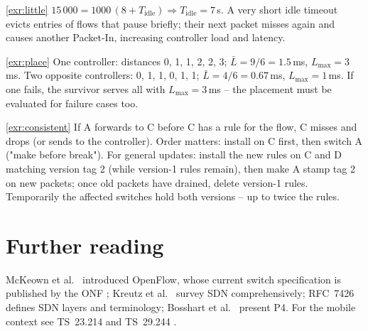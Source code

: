 \documentclass[11pt,a4paper]{article}
\begin{document}
\begin{solutionbox}{\ref{exr:little}}
$15\,000 = 1000\,(8 + T_{\mathrm{idle}}) \Rightarrow T_{\mathrm{idle}} = 7$\,s. A very short idle timeout evicts entries of
flows that pause briefly; their next packet misses again and causes another Packet-In, increasing controller load
and latency.
\end{solutionbox}

\begin{solutionbox}{\ref{exr:place}}
One controller: distances 0, 1, 1, 2, 2, 3; $\bar L = 9/6 = 1.5$\,ms, $L_{\max} = 3$\,ms. Two opposite controllers: 0, 1, 1, 0,
1, 1; $\bar L = 4/6 = 0.67$\,ms, $L_{\max} = 1$\,ms. If one fails, the survivor serves all with $L_{\max} = 3$\,ms -- the
placement must be evaluated for failure cases too.
\end{solutionbox}

\begin{solutionbox}{\ref{exr:consistent}}
If A forwards to C before C has a rule for the flow, C misses and drops (or sends to the controller). Order matters:
install on C first, then switch A ("make before break"). For general updates: install the new rules on C and D
matching version tag 2 (while version-1 rules remain), then make A stamp tag 2 on new packets; once old packets
have drained, delete version-1 rules. Temporarily the affected switches hold both versions -- up to twice the
rules.
\end{solutionbox}

\section{Further reading}
McKeown et al.\ \cite{mckeown2008openflow} introduced OpenFlow, whose current switch specification is published by the ONF
\cite{onf2015openflow}; Kreutz et al.\ \cite{kreutz2015sdn} survey SDN comprehensively; RFC~7426 \cite{rfc7426} defines
SDN layers and terminology; Bosshart et al.\ \cite{bosshart2014p4} present P4. For the mobile context see TS~23.214
\cite{ts23214} and TS~29.244 \cite{ts29244}.

\printbibliography[heading=subbibliography,title={\ACNstrRefs}]
\end{document}
